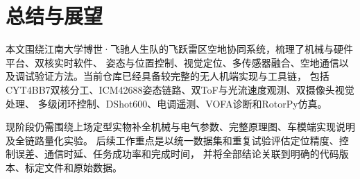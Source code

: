\chapter{总结与展望}

本文围绕江南大学博世·飞驰人生队的飞跃雷区空地协同系统，梳理了机械与硬件平台、双核实时软件、
姿态与位置控制、视觉定位、多传感器融合、空地通信以及调试验证方法。当前仓库已经具备较完整的无人机端实现与工具链，
包括CYT4BB7双核分工、ICM42688姿态链路、双ToF与光流速度观测、双摄像头视觉处理、
多级闭环控制、DShot600、电调遥测、VOFA诊断和RotorPy仿真。

现阶段仍需围绕上场定型实物补全机械与电气参数、完整原理图、车模端实现说明及全链路量化实验。
后续工作重点是以统一数据集和重复试验评估定位精度、控制误差、通信时延、任务成功率和完成时间，
并将全部结论关联到明确的代码版本、标定文件和原始数据。

